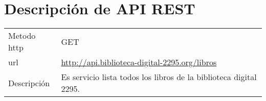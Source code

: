 \chapter{Descripción de API REST}

\begin{table}[H]
\centering
\begin{tabular}{|lp{10cm}|} \hline
Metodo http & GET \\%
url   &  \url{http://api.biblioteca-digital-2295.org/libros}\\
Descripción & Es servicio lista todos los libros de la biblioteca digital 2295.\\ \hline
\end{tabular}
\end{table}